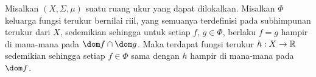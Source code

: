 
 Misalkan $(X,\Sigma,\mu)$ suatu ruang ukur yang
dapat dilokalkan.   Misalkan $\Phi$ keluarga fungsi terukur bernilai riil,
yang semuanya terdefinisi pada subhimpunan terukur dari $X$, sedemikian
sehingga untuk setiap $f$, $g\in\Phi$, berlaku $f=g$ hampir di mana-mana pada
$\dom f\cap\dom g$. Maka terdapat fungsi terukur $h:X\to\Bbb R$ sedemikian
sehingga setiap $f\in\Phi$ sama dengan $h$ hampir di mana-mana pada $\dom f$.

